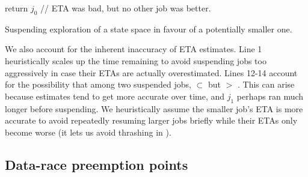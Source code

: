 \begin{algorithm}[t]
	return $j_0$ // ETA was bad, but no other job was better.
	\caption{Suspending exploration of a state space in favour of a potentially smaller one.}
	\label{alg:shouldworkblock}
\end{algorithm}

%
We also account for the inherent inaccuracy of ETA estimates.
Line 1 heuristically scales up the time remaining to avoid suspending jobs too aggressively
in case their ETAs are actually overestimated.
Lines 12-14 account for the
possibility that among two suspended jobs,
 $\subset$ 
but
 $>$ .
This can arise because estimates tend to get more accurate over time,
and $j_1$ perhaps ran much longer before suspending.
We heuristically assume the smaller job's ETA is more accurate
to avoid repeatedly resuming larger jobs briefly while their ETAs only become worse
(it lets us avoid thrashing in \quicksand).


\subsection{Data-race preemption points}
\label{sec:classifying}

